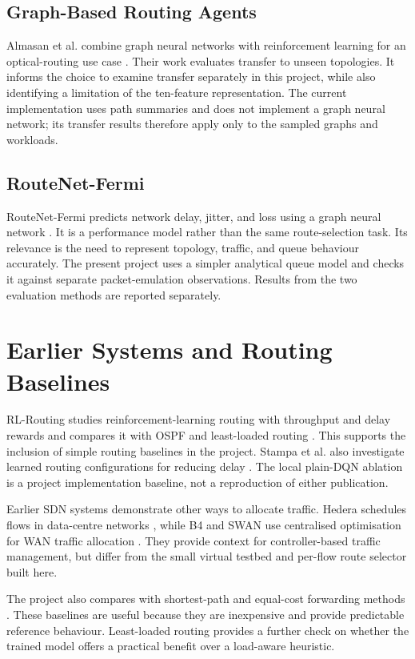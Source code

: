 \documentclass[12pt,a4paper,oneside]{report}
\let\cite\citep
\begin{document}
\subsection{Graph-Based Routing Agents}
Almasan et al. combine graph neural networks with reinforcement learning for an optical-routing use case \cite{almasan2022gnn}. Their work evaluates transfer to unseen topologies. It informs the choice to examine transfer separately in this project, while also identifying a limitation of the ten-feature representation. The current implementation uses path summaries and does not implement a graph neural network; its transfer results therefore apply only to the sampled graphs and workloads.

\subsection{RouteNet-Fermi}
RouteNet-Fermi predicts network delay, jitter, and loss using a graph neural network \cite{almasan2022routenet}. It is a performance model rather than the same route-selection task. Its relevance is the need to represent topology, traffic, and queue behaviour accurately. The present project uses a simpler analytical queue model and checks it against separate packet-emulation observations. Results from the two evaluation methods are reported separately.

\section{Earlier Systems and Routing Baselines}
RL-Routing studies reinforcement-learning routing with throughput and delay rewards and compares it with OSPF and least-loaded routing \cite{chen2020rlrouting}. This supports the inclusion of simple routing baselines in the project. Stampa et al. also investigate learned routing configurations for reducing delay \cite{stampa2017deep}. The local plain-DQN ablation is a project implementation baseline, not a reproduction of either publication.

Earlier SDN systems demonstrate other ways to allocate traffic. Hedera schedules flows in data-centre networks \cite{al2010hedera}, while B4 and SWAN use centralised optimisation for WAN traffic allocation \cite{jain2013b4,hong2013achieving}. They provide context for controller-based traffic management, but differ from the small virtual testbed and per-flow route selector built here.

The project also compares with shortest-path and equal-cost forwarding methods \cite{moy1998ospf}. These baselines are useful because they are inexpensive and provide predictable reference behaviour. Least-loaded routing provides a further check on whether the trained model offers a practical benefit over a load-aware heuristic.
\end{document}
